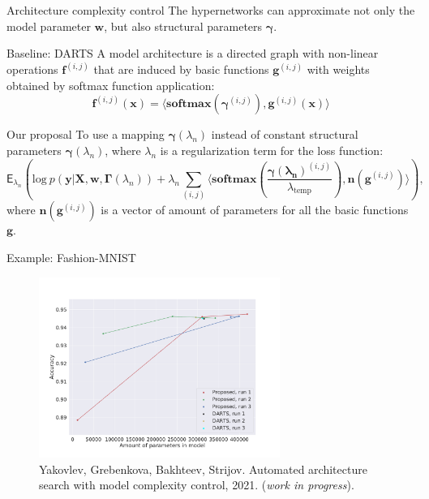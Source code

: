 \documentclass[usenames,dvipsnames,11pt,pdf,utf8,russian,aspectratio=169]{beamer}
\begin{document}
\begin{frame}{Architecture complexity control}
\footnotesize
The hypernetworks can approximate not only the model parameter $\mathbf{w}$, but also structural parameters $\boldsymbol{\gamma}$.
\begin{block}{Baseline: DARTS}
A model architecture is a directed graph with non-linear operations $\mathbf{f}^{(i, j)}$ that are induced by basic functions $\mathbf{g}^{(i, j)}$ with weights obtained by softmax function application:
\[
\mathbf{f}^{(i, j)}(\mathbf{x}) = \langle \textbf{softmax}(\boldsymbol{\gamma}^{(i, j)}), {\mathbf{g}}^{(i,j)}(\mathbf{x})\rangle
\]
\end{block}

\begin{block}{Our proposal}
To use a mapping $\boldsymbol{\gamma}(\lambda_n)$ instead of constant structural parameters $\boldsymbol{\gamma}(\lambda_n)$, where $\lambda_n$ is a regularization term for the loss function:
\[
    \mathsf{E}_{\lambda_n} \left( \text{log}~p(\mathbf{y} | \mathbf{X}, \mathbf{w}, \boldsymbol{\Gamma}(\lambda_n))  +  \lambda_n \sum_{(i,j)}    \langle \textbf{softmax}\left( \frac{\boldsymbol{\gamma(\lambda_n)}^{(i, j)}}{\lambda_\text{temp}} \right), \mathbf{n}({\mathbf{g}}^{(i,j)})\rangle  \right),   
\]
where $\mathbf{n}({\mathbf{g}}^{(i,j)})$ is a vector of amount of parameters for all the basic functions $\mathbf{g}$.
\end{block}

\end{frame}


\begin{frame}{Example: Fashion-MNIST}
\begin{figure}[h]
\includegraphics[width=0.7\textwidth]{./darts.pdf}
\caption*{\footnotesize Yakovlev, Grebenkova, Bakhteev, Strijov. Automated architecture search with model complexity control, 2021. (\textit{work in progress}).}
\end{figure}
\end{frame}
\end{document}

